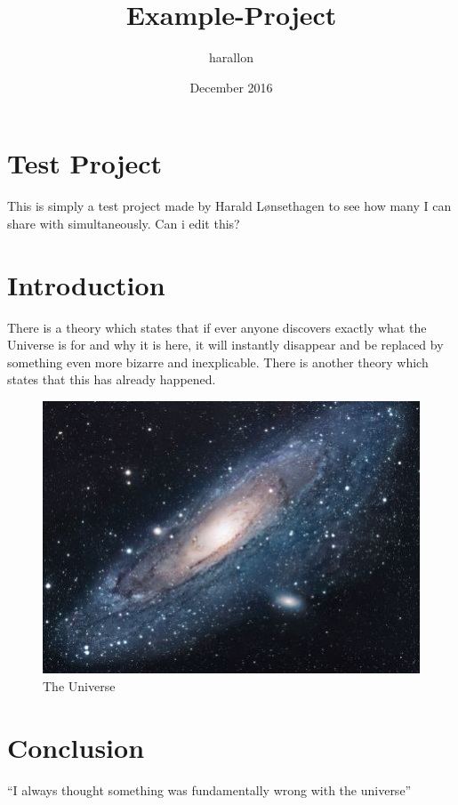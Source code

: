 \documentclass{article}
\title{Example-Project}
\author{harallon }
\date{December 2016}
\begin{document}
\maketitle

\section{Test Project}
This is simply a test project made by Harald Lønsethagen to see how many I can share with simultaneously.
Can i edit this?

\section{Introduction}
There is a theory which states that if ever anyone discovers exactly what the Universe is for and why it is here, it will instantly disappear and be replaced by something even more bizarre and inexplicable.
There is another theory which states that this has already happened.

\begin{figure}[h!]
\centering
\includegraphics[scale=1.7]{universe.jpg}
\caption{The Universe}
\label{fig:univerise}
\end{figure}

\section{Conclusion}
``I always thought something was fundamentally wrong with the universe'' \citep{adams1995hitchhiker}



\end{document}

